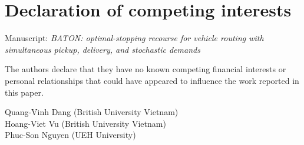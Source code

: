 \documentclass[11pt]{article}
\begin{document}
\section*{Declaration of competing interests}

Manuscript: \emph{BATON: optimal-stopping recourse for vehicle routing
with simultaneous pickup, delivery, and stochastic demands}

The authors declare that they have no known competing financial
interests or personal relationships that could have appeared to
influence the work reported in this paper.

\vspace{16pt}
Quang-Vinh Dang (British University Vietnam)\\[4pt]
Hoang-Viet Vu (British University Vietnam)\\[4pt]
Phuc-Son Nguyen (UEH University)
\end{document}
